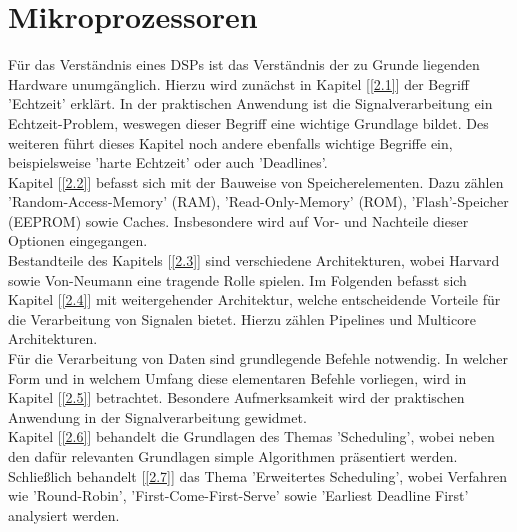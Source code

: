 	\section{Mikroprozessoren}\label{2}

Für das Verständnis eines DSPs ist das Verständnis der zu Grunde liegenden Hardware unumgänglich. Hierzu wird zunächst in Kapitel [\ref{2.1}] der Begriff 'Echtzeit' erklärt. In der praktischen Anwendung ist die Signalverarbeitung ein Echtzeit-Problem, weswegen dieser Begriff eine wichtige Grundlage bildet. Des weiteren führt dieses Kapitel noch andere ebenfalls wichtige Begriffe ein, beispielsweise 'harte Echtzeit' oder auch 'Deadlines'.\\
Kapitel [\ref{2.2}] befasst sich mit der Bauweise von Speicherelementen. Dazu zählen 'Random-Access-Memory' (RAM), 'Read-Only-Memory' (ROM), 'Flash'-Speicher (EEPROM) sowie Caches. Insbesondere wird auf Vor- und Nachteile dieser Optionen eingegangen.\\
Bestandteile des Kapitels [\ref{2.3}] sind verschiedene Architekturen, wobei Harvard sowie Von-Neumann eine tragende Rolle spielen.
Im Folgenden befasst sich Kapitel [\ref{2.4}] mit weitergehender Architektur, welche entscheidende Vorteile für die Verarbeitung von Signalen bietet. Hierzu zählen Pipelines und Multicore Architekturen.\\
Für die Verarbeitung von Daten sind grundlegende Befehle notwendig. In welcher Form und in welchem Umfang diese elementaren Befehle vorliegen, wird in Kapitel [\ref{2.5}] betrachtet. Besondere Aufmerksamkeit wird der praktischen Anwendung in der Signalverarbeitung gewidmet.\\
Kapitel [\ref{2.6}] behandelt die Grundlagen des Themas 'Scheduling', wobei neben den dafür relevanten Grundlagen simple Algorithmen präsentiert werden.
Schließlich behandelt [\ref{2.7}] das Thema 'Erweitertes Scheduling', wobei Verfahren wie 'Round-Robin', 'First-Come-First-Serve' sowie 'Earliest Deadline First' analysiert werden.\\

\newpage

